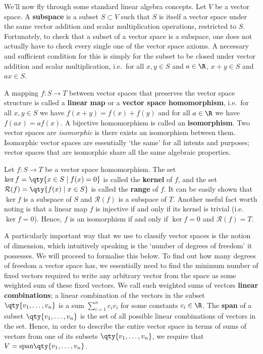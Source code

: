 \vspace{3mm}

We'll now fly through some standard linear algebra concepts. Let \( V \) be a vector space. A \textbf{subspace} is a subset \( S\subset V \) such that \( S \) is itself a vector space under the same vector addition and scalar multiplication operations, restricted to \( S \). Fortunately, to check that a subset of a vector space is a subspace, one does not actually have to check every single one of the vector space axioms. A necessary and sufficient condition for this is simply for the subset to be closed under vector addition and scalar multiplication, i.e.\ for all \( x,y\in S \) and \( a\in\R \), \( x+y\in S \) and \( ax\in S \).

\vspace{3mm}

A mapping \( f:S\to T \) between vector spaces that preserves the vector space structure is called a \textbf{linear map} or a \textbf{vector space homomorphism}, i.e.\ for all \( x,y\in S \) we have \( f(x+y)=f(x)+f(y) \) and for all \( a\in\R \) we have \( f(ax)=af(x) \). A bijective homomorphism is called an \textbf{isomorphism}. Two vector spaces are \emph{isomorphic} is there exists an isomorphism between them. Isomorphic vector spaces are essentially `the same' for all intents and purposes; vector spaces that are isomorphic share all the same algebraic properties.

\vspace{3mm}

Let \( f:S\to T \) be a vector space homomorphism. The set \( \ker f=\qty{x\in S\mid f(x)=0} \) is called the \textbf{kernel} of \( f \), and the set \( \mathcal{R}(f)=\qty{f(x)\mid x\in S} \) is called the \textbf{range} of \( f \). It can be easily shown that \( \ker f \) is a subspace of \( S \) and \( \mathcal{R}(f) \) is a subspace of \( T \). Another useful fact worth noting is that a linear map \( f \) is injective if and only if its kernel is trivial (i.e.\ \( \ker f=\qty{0} \)). Hence, \( f \) is an isomorphism if and only if \( \ker f=\qty{0} \) and \( \mathcal{R}(f)=T \).

\vspace{3mm}

A particularly important way that we use to classify vector spaces is the notion of dimension, which intuitively speaking is the `number of degrees of freedom' it possesses. We will proceed to formalise this below. To find out how many degrees of freedom a vector space has, we essentially need to find the minimum number of fixed vectors required to write any arbitrary vector from the space as some weighted sum of these fixed vectors. We call such weighted sums of vectors \textbf{linear combinations}; a linear combination of the vectors in the subset \( \qty{v_1,\dots,v_n} \) is a sum \( \sum_{i=1}^nc_iv_i \) for some constants \( c_i\in\R \). The \textbf{span} of a subset \( \qty{v_1,\dots,v_n} \) is the set of all possible linear combinations of vectors in the set. Hence, in order to describe the entire vector space in terms of sums of vectors from one of its subsets \( \qty{v_1,\dots,v_n} \), we require that \( V=\text{span}\qty{v_1,\dots,v_n} \).

